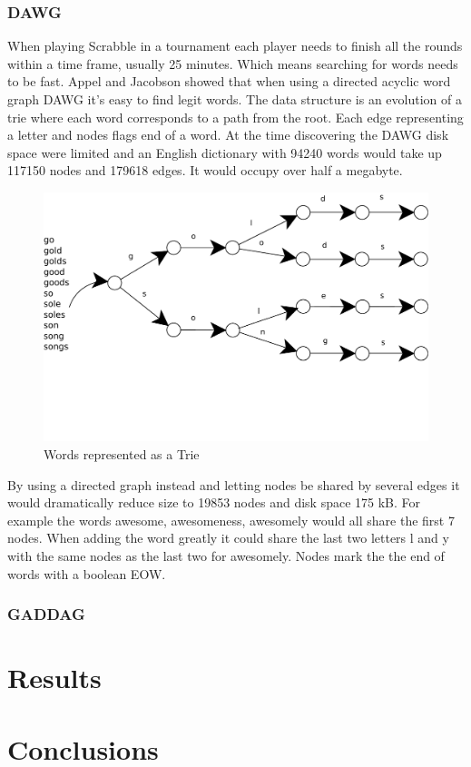 \documentclass[a4paper, 12pt]{report}
\begin{document}
\subsection{DAWG}
When playing Scrabble in a tournament each player needs to finish all the rounds within a time frame, usually 25 minutes. Which means searching for words needs to be fast. Appel and Jacobson showed that when using a directed acyclic word graph DAWG it's easy to find legit words. The data structure is an evolution of a trie where each word corresponds to a path from the root. Each edge representing a letter and nodes flags end of a word. At the time discovering the DAWG disk space were limited and an English dictionary with 94240 words would take up 117150 nodes and 179618 edges. It would occupy over half a megabyte.
\begin{figure}
\centering
\includegraphics[scale=0.6]{trie}
\caption{Words represented as a Trie}
\end{figure}
By using a directed graph instead and letting nodes be shared by several edges it would dramatically reduce size to 19853 nodes and disk space 175 kB. For example the words awesome, awesomeness, awesomely would all share the first 7 nodes. When adding the word greatly it could share the last two letters l and y with the same nodes as the last two for awesomely. Nodes mark the the end of words with a boolean EOW.
\subsection{GADDAG}
\chapter{Results}
\chapter{Conclusions}
\end{document}
